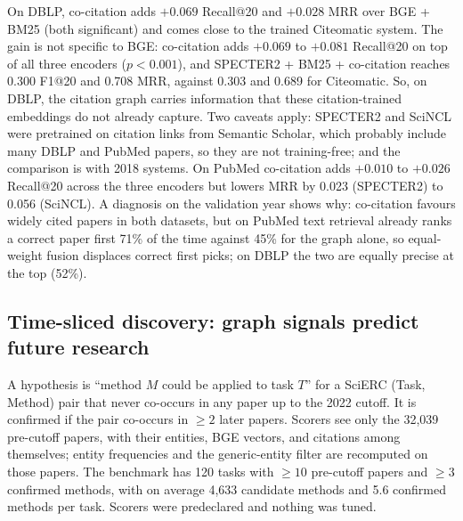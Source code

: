 \documentclass[conference]{IEEEtran}
\begin{document}
On DBLP, co-citation adds $+0.069$ Recall@20 and $+0.028$ MRR over BGE + BM25 (both significant) and comes close to the trained Citeomatic system. The gain is not specific to BGE: co-citation adds $+0.069$ to $+0.081$ Recall@20 on top of all three encoders ($p < 0.001$), and SPECTER2 + BM25 + co-citation reaches 0.300 F1@20 and 0.708 MRR, against 0.303 and 0.689 for Citeomatic. So, on DBLP, the citation graph carries information that these citation-trained embeddings do not already capture. Two caveats apply: SPECTER2 and SciNCL were pretrained on citation links from Semantic Scholar, which probably include many DBLP and PubMed papers, so they are not training-free; and the comparison is with 2018 systems. On PubMed co-citation adds $+0.010$ to $+0.026$ Recall@20 across the three encoders but lowers MRR by 0.023 (SPECTER2) to 0.056 (SciNCL). A diagnosis on the validation year shows why: co-citation favours widely cited papers in both datasets, but on PubMed text retrieval already ranks a correct paper first 71\% of the time against 45\% for the graph alone, so equal-weight fusion displaces correct first picks; on DBLP the two are equally precise at the top (52\%).

\subsection{Time-sliced discovery: graph signals predict future research}
\label{sec:discovery}

A hypothesis is ``method $M$ could be applied to task $T$'' for a SciERC (Task, Method) pair that never co-occurs in any paper up to the 2022 cutoff. It is confirmed if the pair co-occurs in $\geq 2$ later papers. Scorers see only the 32,039 pre-cutoff papers, with their entities, BGE vectors, and citations among themselves; entity frequencies and the generic-entity filter are recomputed on those papers. The benchmark has 120 tasks with $\geq 10$ pre-cutoff papers and $\geq 3$ confirmed methods, with on average 4,633 candidate methods and 5.6 confirmed methods per task. Scorers were predeclared and nothing was tuned.
\end{document}
